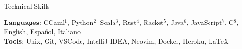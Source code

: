 
\begin{rSection}{Technical Skills}

	\textbf{Languages}: OCaml$^{1}$, Python$^{2}$, Scala$^{3}$, Rust$^{4}$, Racket$^{5}$, Java$^{6}$, JavaScript$^{7}$, C$^{8}$, English, Espa{\~n}ol, Italiano
	\\
	\textbf{Tools}: Unix, Git, VSCode, IntelliJ IDEA, Neovim, Docker, Heroku, \LaTeX
\end{rSection}